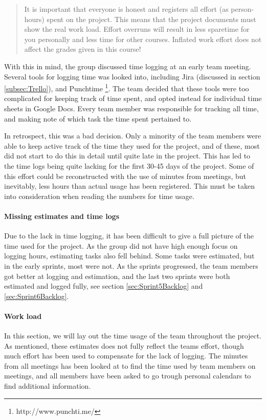 \documentclass[11pt,a4paper,titlepage,oneside]{report}
\begin{document}
\begin{quote}
It is important that everyone is honest and registers all effort (as person-hours) spent on the project. This means that the project documents must show the real work load. Effort overruns will result in less sparetime for you personally and less time for other courses. Inflated work effort does not affect the grades given in this course! \cite{TDT4290:Intro}
\end{quote}

With this in mind, the group discussed time logging at an early team meeting. Several tools for logging time was looked into, including Jira (discussed in section \ref{subsec:Trello}), and Punchtime \footnote{http://www.punchti.me/}. The team decided that these tools were too complicated for keeping track of time spent, and opted instead for individual time sheets in Google Docs. Every team member was responsible for tracking all time, and making note of which task the time spent pertained to. 

In retrospect, this was a bad decision. Only a minority of the team members were able to keep active track of the time they used for the project, and of these, most did not start to do this in detail until quite late in the project. This has led to the time logs being quite lacking for the first 30-45 days of the project. Some of this effort could be reconstructed with the use of minutes from meetings, but inevitably, less hours than actual usage has been registered. This must be taken into consideration when reading the numbers for time usage.  

\paragraph{Missing estimates and time logs}
Due to the lack in time logging, it has been difficult to give a full picture of the time used for the project. As the group did not have high enough focus on logging hours, estimating tasks also fell behind. Some tasks were estimated, but in the early sprints, most were not. As the sprints progressed, the team members got better at logging and estimation, and the last two sprints were both estimated and logged fully, see section \ref{sec:Sprint5Backlog} and \ref{sec:Sprint6Backlog}.

\paragraph{Work load}
In this section, we will lay out the time usage of the team throughout the project. As mentioned, these estimates does not fully reflect the teams effort, though much effort has been used to compensate for the lack of logging. The minutes from all meetings has been looked at to find the time used by team members on meetings, and all members have been asked to go trough personal calendars to find additional information.
\end{document}
